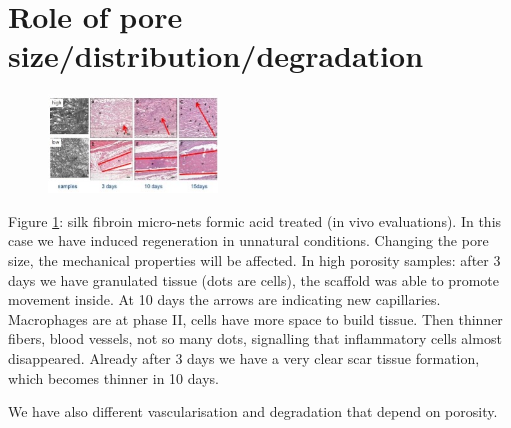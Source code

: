 \section{Role of pore size/distribution/degradation}
\begin{figure}[ht]
\centering
\includegraphics[width=0.4\textwidth]{silk}
\caption{\label{fig:silk}}
\end{figure}

\noindent
Figure \ref{fig:silk}: silk fibroin micro-nets formic acid treated (in vivo evaluations). 
In this case we have induced regeneration in unnatural conditions. 
Changing the pore size, the mechanical properties will be affected. In high porosity samples: after 3 days we have granulated tissue (dots are cells), the scaffold was able to promote movement inside. 
At 10 days the arrows are indicating new capillaries. 
Macrophages are at phase II, cells have more space to build tissue. 
Then thinner fibers, blood vessels, not so many dots, signalling that inflammatory cells almost disappeared. 
Already after 3 days we have a very clear scar tissue formation, which becomes thinner in 10 days. 

We have also different vascularisation and degradation that depend on porosity.
